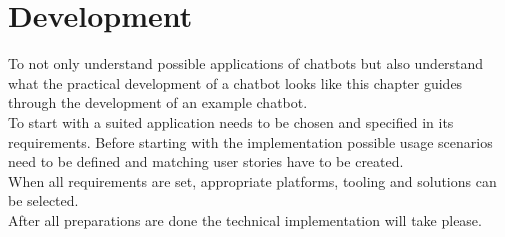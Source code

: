 \chapter{Development}


To not only understand possible applications of chatbots but also understand what the practical development of a chatbot looks like this chapter guides through the development of an example chatbot.
\\

To start with a suited application needs to be chosen and specified in its requirements.
Before starting with the implementation possible usage scenarios need to be defined and matching user stories have to be created.
\\
When all requirements are set, appropriate platforms, tooling and solutions can be selected.
\\
After all preparations are done the technical implementation will take please.

